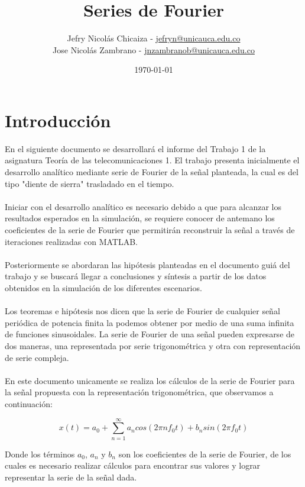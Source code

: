 \documentclass[12pt]{article}
\date{\today}.
\title{\textbf{Series de Fourier}}
\author{
    Jefry Nicolás Chicaiza - \url{jefryn@unicauca.edu.co}\\
    Jose Nicolás Zambrano - \url{jnzambranob@unicauca.edu.co}
}
\date{}
\begin{document}
\maketitle
\thispagestyle{fancy}
\section*{Introducción}
    En el siguiente documento se desarrollará el informe del Trabajo 1 de la asignatura 
    Teoría de las telecomunicaciones 1. El trabajo presenta inicialmente el desarrollo 
    analítico mediante serie de Fourier de la señal planteada, la cual es del tipo 
    "diente de sierra"  trasladado en el tiempo.\\
    \\
    Iniciar con el desarrollo analítico es necesario debido a que para alcanzar los 
    resultados esperados en la simulación, se requiere conocer de antemano los coeficientes 
    de la serie de Fourier que permitirán reconstruir la señal a través de iteraciones 
    realizadas con MATLAB.\\
    \\
    Posteriormente se abordaran las hipótesis planteadas en el documento guiá del trabajo 
    y se buscará llegar a conclusiones y síntesis a partir de los datos obtenidos en la 
    simulación de los diferentes escenarios.\\
    \\
    Los teoremas e hipótesis nos dicen que la serie de Fourier de cualquier señal periódica de potencia 
    finita la podemos obtener por medio de una suma infinita de funciones sinusoidales. La serie de 
    Fourier de una señal pueden expresarse de dos maneras, una representada por serie trigonométrica y 
    otra con representación de serie compleja.\\ 
    \\
    En este documento unicamente se realiza los cálculos de la serie de Fourier para la señal propuesta 
    con la representación trigonométrica, que observamos a continuación:

    \begin{equation}
        x(t)=a_{0}+\sum_{n=1}^{\infty} a_{n}cos(2\pi nf_{0}t)+b_{n}sin(2\pi f_{0}t)
        \label{equation1}
    \end{equation}
    
    Donde los términos $a_{0}$, $a_{n}$ y $b_{n}$ son los coeficientes de la serie de Fourier, de los cuales
    es necesario realizar cálculos para encontrar sus valores y lograr representar la serie de la señal dada.
\end{document}
